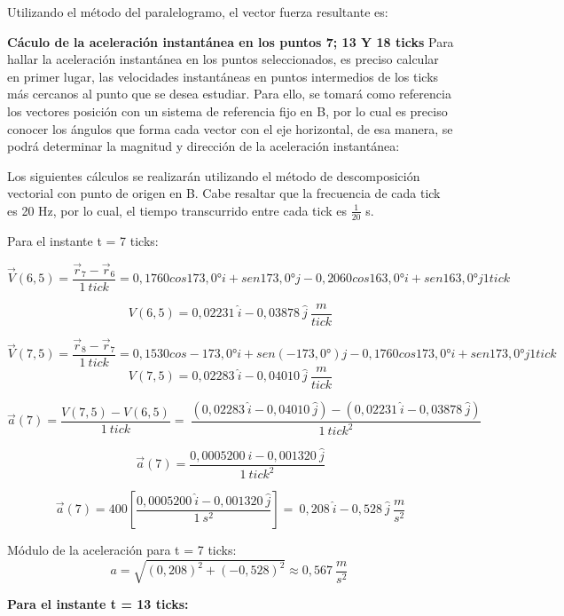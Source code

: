 \documentclass[../main.tex]{subfiles}
\begin{document}

Utilizando el método del paralelogramo, el vector fuerza resultante es: 



\textbf{Cáculo de la aceleración instantánea en los puntos 7; 13 Y 18 ticks}
Para hallar la aceleración instantánea en los puntos seleccionados, es preciso
calcular en primer lugar, las velocidades instantáneas en puntos intermedios de
los ticks más cercanos al punto que se desea estudiar. Para ello, se tomará como 
referencia los vectores posición con un sistema de referencia fijo en B,
 por lo cual es preciso conocer los ángulos que forma cada vector con el 
 eje horizontal, de esa manera, se podrá determinar la magnitud y dirección
  de la aceleración instantánea:


Los siguientes cálculos se realizarán utilizando el método de descomposición vectorial con punto de origen en B. Cabe resaltar que la frecuencia de cada tick es 20 Hz, por lo cual,
el tiempo transcurrido entre cada tick es $\frac{1}{20}$ s.


Para el instante t = 7 ticks:

\[\vec{V}\left(6,5\right)=\frac{{\vec{r}}_7-{\vec{r}}_6}{1\ tick}=0,1760cos173,0°i+sen173,0° j-0,2060cos163,0°i+sen163,0° j1 tick\]

\[V\left(6,5\right)=0,02231\ \hat{i}-0,03878\ \hat{j}\ \frac{m}{tick}\]

\[\vec{V}\left(7,5\right)=\frac{{\vec{r}}_8-{\vec{r}}_7}{1\ tick}=0,1530cos-173,0°i+sen(-173,0°)j-0,1760cos173,0°i+sen173,0°j1 tick\]
\[V\left(7,5\right)=0,02283\ \hat{i}-0,04010\ \hat{j}\ \frac{m}{tick}\]

\[\vec{a}\left(7\right)=\frac{V\left(7,5\right)-V\left(6,5\right)}{1\ tick}=\ \frac{\left(0,02283\ \hat{i}-0,04010\ \hat{j}\right)-\left(0,02231\ \hat{i}-0,03878\ \hat{j}\right)}{1\ {tick}^2}\]

\[\vec{a}\left(7\right)=\frac{0,0005200\ \hat{i}-0,001320\ \hat{j}}{1\ {tick}^2}\]

\[\vec{a}\left(7\right)=400\left[\frac{0,0005200\ \hat{i}-0,001320\ \hat{j}}{1\ s^2}\right]=\ 0,208\ \hat{i}-0,528\ \hat{j}\ \frac{m}{s^2}\]


Módulo de la aceleración para t = 7 ticks:
\[a=\sqrt{\left(0,208\right)^2+\left(-0,528\right)^2}\approx0,567\ \frac{m}{s^2}\ \]

\textbf{Para el instante t = 13 ticks:}
\end{document}
